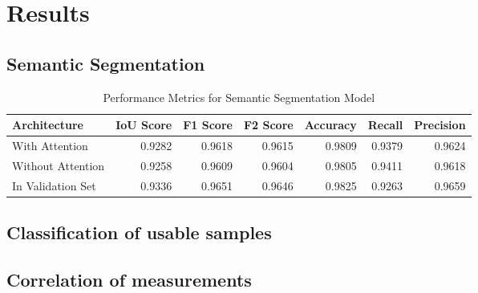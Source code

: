 \chapter{Results}
\section{Semantic Segmentation}
 \begin{table}
    \caption{Performance Metrics for Semantic Segmentation Model}
    \label{tab:metrics}
        \begin{tabular}{lrrrrrr}
            \toprule
            Architecture & IoU Score & F1 Score & F2 Score & Accuracy & Recall & Precision \\
            \midrule
            With Attention & 0.9282 & 0.9618 & 0.9615 & 0.9809 & 0.9379 & 0.9624 \\
            Without Attention & 0.9258 & 0.9609 & 0.9604 & 0.9805 & 0.9411 & 0.9618 \\
            In Validation Set & 0.9336 & 0.9651 & 0.9646 & 0.9825 & 0.9263 & 0.9659 \\
            \bottomrule
        \end{tabular}
    \end{table}

\section{Classification of usable samples}

\section{Correlation of measurements}


